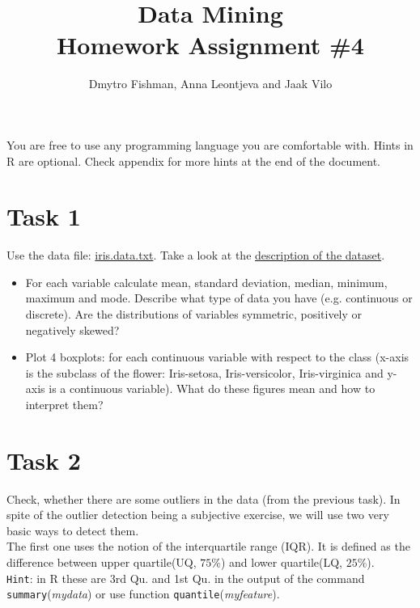 \documentclass{article}
\title{Data Mining\\Homework Assignment \#4} %
\author{Dmytro Fishman, Anna Leontjeva and Jaak Vilo} %
\begin{document}
\maketitle %

You are free to use any programming language you are comfortable with. Hints in R are optional. Check appendix for more hints at the end of the document.

\section*{Task 1}
Use the data file: \href{http://www0.cs.ucl.ac.uk/staff/m.herbster/GI07/week4/iris.data.txt}{iris.data.txt}. Take a look at the \href{http://archive.ics.uci.edu/ml/datasets/Iris}{description of the dataset}. 
\begin{itemize}
\item For each variable calculate mean, standard deviation, median, minimum, maximum and mode. Describe what type of data you have (e.g. continuous or discrete). Are the distributions of variables symmetric, positively or negatively skewed?
\item Plot 4 boxplots: for each continuous variable with respect to the class (x-axis is the subclass of the flower: Iris-setosa, Iris-versicolor, Iris-virginica and y-axis is a continuous variable). What do these figures mean and how to interpret them? 
\end{itemize}
\section*{Task 2}
Check, whether there are some outliers in the data (from the previous task). In spite of the outlier detection being a subjective exercise, we will use two very basic ways to detect them. 
\\
The first one uses the notion of the interquartile range (IQR). It is defined as the difference between upper quartile(UQ, $75\%$) and lower quartile(LQ, $25\%$).\\ 

\texttt{Hint}: in R these are 3rd Qu. and 1st Qu. in the output of the command \texttt{summary}(\emph{mydata}) or use function \texttt{quantile}(\emph{myfeature}).\\ 
\end{document}
